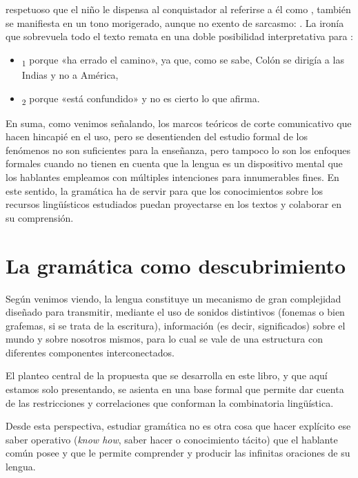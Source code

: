 \begin{itemize}
        respetuoso que el niño le dispensa al conquistador al referirse a él
        como , también se manifiesta en un tono morigerado, aunque
        no exento de sarcasmo: . La ironía
        que sobrevuela todo el texto remata en una doble posibilidad
        interpretativa para :
        \begin{itemize}
          \item {}\textsubscript{1} porque «ha errado el
                camino», ya que, como se sabe, Colón se dirigía a las Indias y
                no a América,
          \item {}\textsubscript{2} porque «está confundido»
                y no es cierto lo que afirma.
        \end{itemize}
\end{itemize}

En suma, como venimos señalando, los marcos teóricos de corte comunicativo que
hacen hincapié en el uso, pero se desentienden del estudio formal de los
fenómenos no son suficientes para la enseñanza, pero tampoco lo son los
enfoques formales cuando no tienen en cuenta que la lengua es un dispositivo
mental que los hablantes empleamos con múltiples intenciones para innumerables
fines. En este sentido, la gramática ha de servir para que los conocimientos
sobre los recursos lingüísticos estudiados puedan proyectarse en los textos y
colaborar en su comprensión.

\section{La gramática como descubrimiento}

Según venimos viendo, la lengua constituye un mecanismo de gran complejidad
diseñado para transmitir, mediante el uso de sonidos distintivos (fonemas o
bien grafemas, si se trata de la escritura), información (es decir,
significados) sobre el mundo y sobre nosotros mismos, para lo cual se vale de
una estructura con diferentes componentes interconectados.

El planteo central de la propuesta que se desarrolla en este libro, y que aquí
estamos solo presentando, se asienta en una base formal que permite dar cuenta
de las restricciones y correlaciones que conforman la combinatoria lingüística.

\begin{destacado}
Desde esta perspectiva, estudiar gramática no es otra cosa que hacer explícito
ese saber operativo (\textit{know how}, saber hacer o conocimiento tácito) que
el hablante común posee y que le permite comprender y producir las infinitas
oraciones de su lengua.
\end{destacado}

